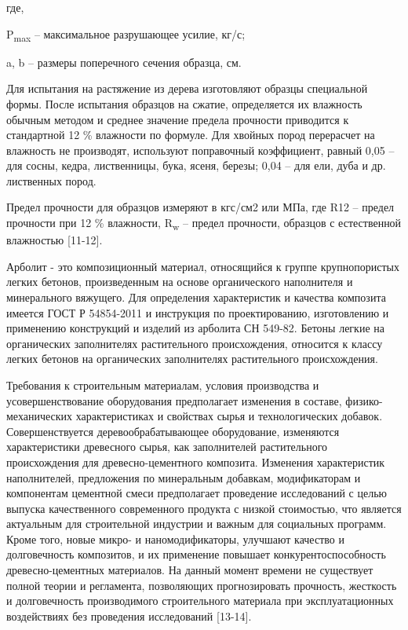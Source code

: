 где,

P\textsubscript{max} -- максимальное разрушающее усилие, кг/с;

a, b -- размеры поперечного сечения образца, см.

Для испытания на растяжение из дерева изготовляют образцы специальной
формы. После испытания образцов на сжатие, определяется их влажность
обычным методом и среднее значение предела прочности приводится к
стандартной 12 \% влажности по формуле. Для хвойных пород перерасчет на
влажность не производят, используют поправочный коэффициент, равный 0,05
-- для сосны, кедра, лиственницы, бука, ясеня, березы; 0,04 -- для ели,
дуба и др. лиственных пород.

Предел прочности для образцов измеряют в кгс/см2 или МПа, где R12 --
предел прочности при 12 \% влажности, R\textsubscript{w} -- предел
прочности, образцов с естественной влажностью {[}11-12{]}.

Арболит - это композиционный материал, относящийся к группе
крупнопористых легких бетонов, произведенным на основе органического
наполнителя и минерального вяжущего. Для определения характеристик и
качества композита имеется ГОСТ Р 54854-2011 и инструкция по
проектированию, изготовлению и применению конструкций и изделий из
арболита СН 549-82. Бетоны легкие на органических заполнителях
растительного происхождения, относится к классу легких бетонов на
органических заполнителях растительного происхождения.

Требования к строительным материалам, условия производства и
усовершенствование оборудования предполагает изменения в составе,
физико-механических характеристиках и свойствах сырья и технологических
добавок. Совершенствуется деревообрабатывающее оборудование, изменяются
характеристики древесного сырья, как заполнителей растительного
происхождения для древесно-цементного композита. Изменения характеристик
наполнителей, предложения по минеральным добавкам, модификаторам и
компонентам цементной смеси предполагает проведение исследований с целью
выпуска качественного современного продукта с низкой стоимостью, что
является актуальным для строительной индустрии и важным для социальных
программ. Кроме того, новые микро- и наномодификаторы, улучшают качество
и долговечность композитов, и их применение повышает
конкурентоспособность древесно-цементных материалов. На данный момент
времени не существует полной теории и регламента, позволяющих
прогнозировать прочность, жесткость и долговечность производимого
строительного материала при эксплуатационных воздействиях без проведения
исследований {[}13-14{]}.

